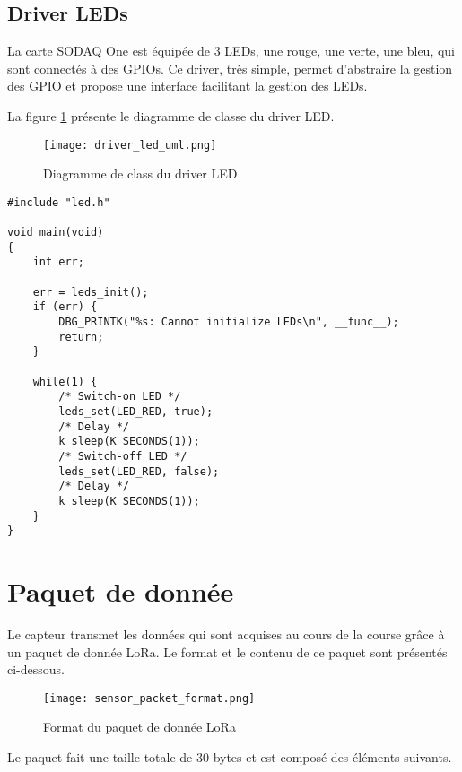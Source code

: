 \subsection{Driver LEDs}

La carte SODAQ One est équipée de 3 LEDs, une rouge, une verte, une bleu, qui sont connectés à des GPIOs. Ce driver, très simple, permet d'abstraire la gestion des GPIO et propose une interface facilitant la gestion des LEDs.

La figure \ref{fig:driver_led_uml} présente le diagramme de classe du driver LED.

\begin{figure}[htb]
\centering 
\texttt{[image: driver\_led\_uml.png]} 
\caption{Diagramme de class du driver LED}
\label{fig:driver_led_uml}
\end{figure}

\begin{lstlisting}[style=CStyle]
#include "led.h"

void main(void)
{
	int err;

	err = leds_init();
	if (err) {
		DBG_PRINTK("%s: Cannot initialize LEDs\n", __func__);
		return;
	}
	
	while(1) {
		/* Switch-on LED */
		leds_set(LED_RED, true);
		/* Delay */
		k_sleep(K_SECONDS(1));
		/* Switch-off LED */
		leds_set(LED_RED, false);
		/* Delay */
		k_sleep(K_SECONDS(1));		
	}
}
\end{lstlisting}

\section{Paquet de donnée}

Le capteur transmet les données qui sont acquises au cours de la course grâce à un paquet de donnée LoRa. Le format et le contenu de ce paquet sont présentés ci-dessous.

\begin{figure}[htb]
\centering 
\texttt{[image: sensor\_packet\_format.png]} 
\caption{Format du paquet de donnée LoRa}
\label{fig:sensor_packet_format}
\end{figure}

Le paquet fait une taille totale de 30 bytes et est composé des éléments suivants.

